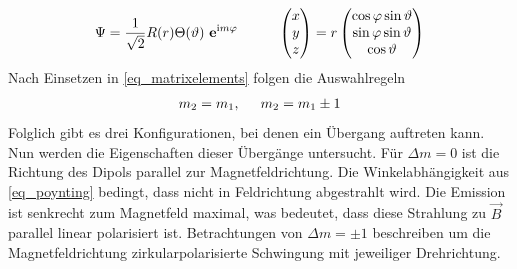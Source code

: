 \begin{align}
 \Psi = \frac{1}{\sqrt{2}}R(r)\Theta(\vartheta)\ \mathbf{e}^{\text{i}m\varphi} \hspace{1cm}\begin{pmatrix} x \\ y\\z \end{pmatrix}=r\begin{pmatrix}\cos\varphi\sin\vartheta \\ \sin\varphi\sin\vartheta \\ \cos\vartheta \end{pmatrix}
\end{align}
Nach Einsetzen in \eqref{eq_matrixelements} folgen die Auswahlregeln
\begin{align}
 m_2 = m_1, \hspace{0.5cm} m_2 = m_1\pm1
\end{align}
Folglich gibt es drei Konfigurationen, bei denen ein Übergang auftreten kann. Nun werden die Eigenschaften dieser Übergänge untersucht. Für 
$\Delta m = 0$  ist die Richtung des Dipols parallel zur Magnetfeldrichtung. Die Winkelabhängigkeit aus \eqref{eq_poynting} bedingt, dass nicht
in Feldrichtung abgestrahlt wird. Die Emission ist senkrecht zum Magnetfeld maximal, was bedeutet, dass diese Strahlung zu $\vec B$ parallel 
linear polarisiert ist. Betrachtungen von $\Delta m = \pm 1$ beschreiben um die Magnetfeldrichtung zirkularpolarisierte Schwingung mit jeweiliger
Drehrichtung.

